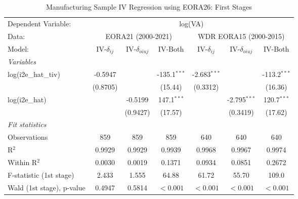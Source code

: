 \documentclass[a4paper]{article}
\begin{document}
\begin{table}[h!]
   \caption{\label{tab:MS_RES_F1} Manufacturing Sample IV Regression using EORA26: First Stages}
   \centering
   \begin{tabular}{lcccccc}
      \tabularnewline \midrule \midrule
      Dependent Variable: & \multicolumn{6}{c}{log(VA)}\\
      Data: & \multicolumn{3}{c}{EORA21 (2000-2021)} & \multicolumn{3}{c}{WDR EORA15 (2000-2015)} \\
      Model:                   & IV-$\delta_{ij}$      & IV-$\delta_{oiuj}$    & IV-Both              & IV-$\delta_{ij}$      & IV-$\delta_{oiuj}$    & IV-Both\\  
      \midrule
      \emph{Variables}\\
      log(i2e\_hat\_tiv)        & -0.5947               &                        & -135.1$^{***}$         & -2.683$^{***}$        &                        & -113.2$^{***}$\\   
                                & (0.8705)              &                        & (15.44)                & (0.3312)              &                        & (16.36)\\   
      log(i2e\_hat)             &                       & -0.5199                & 147.1$^{***}$          &                       & -2.795$^{***}$         & 120.7$^{***}$\\   
                                &                       & (0.9427)               & (17.57)                &                       & (0.3419)               & (17.62)\\  
      \emph{Fit statistics}\\
     Observations              & 859                   & 859                    & 859                    & 640                   & 640                    & 640\\  
      R$^2$                     & 0.9929                & 0.9929                 & 0.9939                 & 0.9968                & 0.9967                 & 0.9974\\  
      Within R$^2$              & 0.0030                & 0.0019                 & 0.1371                 & 0.0934                & 0.0851                 & 0.2672\\  
      F-statistic (1st stage)        & 2.433                 & 1.555                  & 64.88                  & 61.72                 & 55.70                  & 109.0\\  
      Wald (1st stage), p-value & 0.4947                & 0.5814                 & $<0.001$  & $<0.001$  & $<0.001$   & $<0.001$\\     

\end{tabular}
\end{table}
\end{document}
